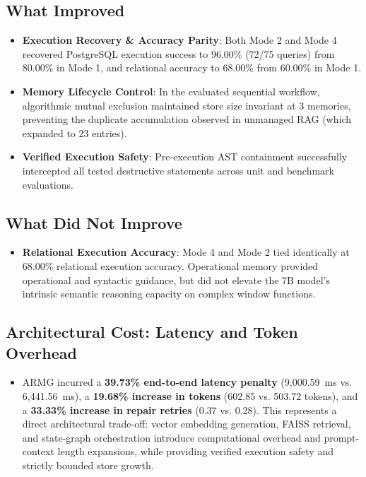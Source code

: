 \documentclass[conference]{IEEEtran}
\begin{document}
\subsection{What Improved}
\begin{itemize}
    \item \textbf{Execution Recovery \& Accuracy Parity}: Both Mode 2 and Mode 4 recovered PostgreSQL execution success to 96.00\% (72/75 queries) from 80.00\% in Mode 1, and relational accuracy to 68.00\% from 60.00\% in Mode 1.
    \item \textbf{Memory Lifecycle Control}: In the evaluated sequential workflow, algorithmic mutual exclusion maintained store size invariant at 3 memories, preventing the duplicate accumulation observed in unmanaged RAG (which expanded to 23 entries).
    \item \textbf{Verified Execution Safety}: Pre-execution AST containment successfully intercepted all tested destructive statements across unit and benchmark evaluations.
\end{itemize}

\subsection{What Did Not Improve}
\begin{itemize}
    \item \textbf{Relational Execution Accuracy}: Mode 4 and Mode 2 tied identically at 68.00\% relational execution accuracy. Operational memory provided operational and syntactic guidance, but did not elevate the 7B model's intrinsic semantic reasoning capacity on complex window functions.
\end{itemize}

\subsection{Architectural Cost: Latency and Token Overhead}
\begin{itemize}
    \item ARMG incurred a \textbf{39.73\% end-to-end latency penalty} (9,000.59~ms vs. 6,441.56~ms), a \textbf{19.68\% increase in tokens} (602.85 vs. 503.72 tokens), and a \textbf{33.33\% increase in repair retries} (0.37 vs. 0.28). This represents a direct architectural trade-off: vector embedding generation, FAISS retrieval, and state-graph orchestration introduce computational overhead and prompt-context length expansions, while providing verified execution safety and strictly bounded store growth.
\end{itemize}
\end{document}
